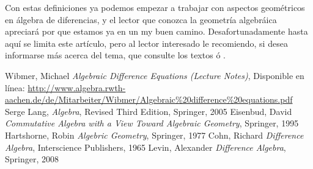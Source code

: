 \documentclass[12pt,a4paper,BCOR15mm,twoside,DIV12]{article}
\theoremstyle{definition}
\begin{document}
Con estas definiciones ya podemos empezar a trabajar con aspectos geométricos en álgebra de diferencias, y el lector que conozca la geometría algebráica apreciará por que estamos ya en un my buen camino.
Desafortunadamente hasta aquí se limita este artículo, pero al lector interesado le recomiendo, si desea informarse más acerca del tema, que consulte los textos \cite{cohn} ó \cite{levin}.


\begin{thebibliography}{9}
 Wibmer, Michael \emph{Algebraic Difference Equations (Lecture Notes)}, Disponible en línea: \url{http://www.algebra.rwth-aachen.de/de/Mitarbeiter/Wibmer/Algebraic%20difference%20equations.pdf}
 Serge Lang, \emph{Algebra}, Revised Third Edition, Springer, 2005
 Eisenbud, David \emph{Commutative Algebra with a View Toward Algebraic Geometry}, Springer, 1995
 Hartshorne, Robin \emph{Algebric Geometry}, Springer, 1977
 Cohn,  Richard \emph{Difference Algebra}, Interscience Publishers, 1965
 Levin, Alexander \emph{Difference Algebra}, Springer, 2008
\end{thebibliography}
\end{document}
